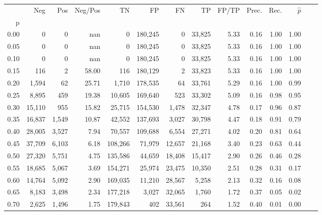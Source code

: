 \begin{tabular}{rrrrrrrrrrrrrr}
\toprule
{} &     Neg &    Pos & Neg/Pos &       TN &       FP &      FN &      TP & FP/TP & Prec. &  Rec. & $\hat{p}$ \\
p    &         &        &         &          &          &         &         &       &       &       &           \\
\midrule
0.00 &       0 &      0 &     nan &        0 &  180,245 &       0 &  33,825 &  5.33 &  0.16 &  1.00 &      1.00 \\
0.05 &       0 &      0 &     nan &        0 &  180,245 &       0 &  33,825 &  5.33 &  0.16 &  1.00 &      1.00 \\
0.10 &       0 &      0 &     nan &        0 &  180,245 &       0 &  33,825 &  5.33 &  0.16 &  1.00 &      1.00 \\
0.15 &     116 &      2 &   58.00 &      116 &  180,129 &       2 &  33,823 &  5.33 &  0.16 &  1.00 &      1.00 \\
0.20 &   1,594 &     62 &   25.71 &    1,710 &  178,535 &      64 &  33,761 &  5.29 &  0.16 &  1.00 &      0.99 \\
0.25 &   8,895 &    459 &   19.38 &   10,605 &  169,640 &     523 &  33,302 &  5.09 &  0.16 &  0.98 &      0.95 \\
0.30 &  15,110 &    955 &   15.82 &   25,715 &  154,530 &   1,478 &  32,347 &  4.78 &  0.17 &  0.96 &      0.87 \\
0.35 &  16,837 &  1,549 &   10.87 &   42,552 &  137,693 &   3,027 &  30,798 &  4.47 &  0.18 &  0.91 &      0.79 \\
0.40 &  28,005 &  3,527 &    7.94 &   70,557 &  109,688 &   6,554 &  27,271 &  4.02 &  0.20 &  0.81 &      0.64 \\
0.45 &  37,709 &  6,103 &    6.18 &  108,266 &   71,979 &  12,657 &  21,168 &  3.40 &  0.23 &  0.63 &      0.44 \\
0.50 &  27,320 &  5,751 &    4.75 &  135,586 &   44,659 &  18,408 &  15,417 &  2.90 &  0.26 &  0.46 &      0.28 \\
0.55 &  18,685 &  5,067 &    3.69 &  154,271 &   25,974 &  23,475 &  10,350 &  2.51 &  0.28 &  0.31 &      0.17 \\
0.60 &  14,764 &  5,092 &    2.90 &  169,035 &   11,210 &  28,567 &   5,258 &  2.13 &  0.32 &  0.16 &      0.08 \\
0.65 &   8,183 &  3,498 &    2.34 &  177,218 &    3,027 &  32,065 &   1,760 &  1.72 &  0.37 &  0.05 &      0.02 \\
0.70 &   2,625 &  1,496 &    1.75 &  179,843 &      402 &  33,561 &     264 &  1.52 &  0.40 &  0.01 &      0.00 \\

\end{tabular}
